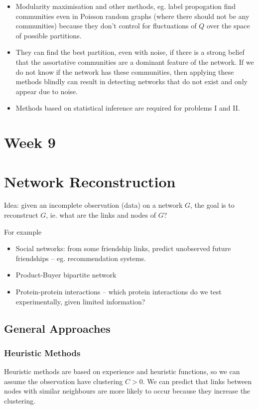 \documentclass[12pt]{article}
\theoremstyle{definition}
\begin{document}
\begin{itemize}
    \item Modularity maximisation and other methods, eg. label propogation find communities even in Poisson random graphs (where there should not be any communities) because they don't control for fluctuations of $Q$ over the space of possible partitions.

    \item They can find the best partition, even with noise, if there is a strong belief that the assortative communities are a dominant feature of the network. If we do not know if the network has these communities, then applying these methods blindly can result in detecting networks that do not exist and only appear due to noise.

    \item Methods based on statistical inference are required for problems I and II.
\end{itemize}

\pagebreak


\section*{Week 9}

\section{Network Reconstruction}

Idea: given an incomplete observation (data) on a network $G$, the goal is to reconstruct $G$, ie. what are the links and nodes of $G$?

For example
\begin{itemize}
    \item Social networks: from some friendship links, predict unobserved future friendships -- eg. recommendation systems.
    \item Product-Buyer bipartite network
    \item Protein-protein interactions -- which protein interactions do we test experimentally, given limited information?
\end{itemize}

\subsection{General Approaches}
\subsubsection{Heuristic Methods}
Heuristic methods are based on experience and heuristic functions, so we can assume the observation have clustering $C>0$. We can predict that links between nodes with similar neighbours are more likely to occur because they increase the clustering. 
\end{document}

